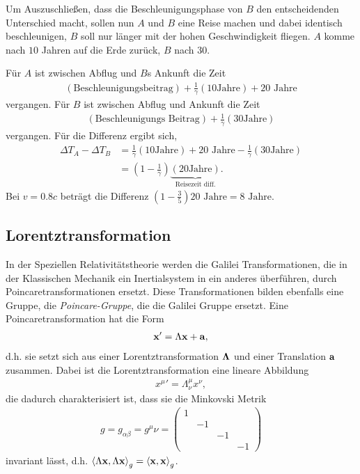 \begin{bsp}
Um Auszuschließen, dass die Beschleunigungsphase von $B$ den entscheidenden
Unterschied macht, sollen nun $A$ und $B$ eine Reise machen und dabei identisch
beschleunigen, $B$ soll nur länger mit der hohen Geschwindigkeit fliegen.
$A$ komme nach $10$ Jahren auf die Erde zurück, $B$ nach $30$.

Für $A$ ist zwischen Abflug und $B$s Ankunft die Zeit
\begin{align*}
(\text{Beschleunigungsbeitrag}) + \frac{1}{\gamma}\left(10 \text{
Jahre}\right) + 20\text{ Jahre}
\end{align*}
vergangen. Für $B$ ist zwischen Abflug und Ankunft die Zeit
\begin{align*}
(\text{Beschleunigungs Beitrag}) + \frac{1}{\gamma}\left(30 \text{
Jahre}\right)
\end{align*}
vergangen. Für die Differenz ergibt sich,
\begin{align*}
\Delta T_A - \Delta T_B &=  \frac{1}{\gamma}\left(10 \text{
Jahre}\right) + 20\text{ Jahre} - \frac{1}{\gamma}\left(30 \text{
Jahre}\right) \\ 
&= \left(1-\frac{1}{\gamma}\right)\underbrace{\left(20\text{
Jahre}\right)}_{\text{Reisezeit diff.}}.
\end{align*}
Bei $v=0.8c$ beträgt die Differenz $\left(1-\frac{3}{5}\right)20\text{ Jahre} =
8\text{ Jahre}$.\bsphere
\end{bsp}

\subsection{Lorentztransformation}

In der Speziellen Relativitätstheorie werden die Galilei Transformationen, die
in der Klassischen Mechanik ein Inertialsystem in ein anderes überführen,
durch Poincaretransformationen ersetzt. Diese Transformationen bilden ebenfalls
eine Gruppe, die \emph{Poincare-Gruppe}, die die Galilei Gruppe ersetzt. Eine
Poincaretransformation hat die Form
\begin{align*}
\bm{\mathrm{x}}' = \Lambda\bm{\mathrm{x}}+\bm{\mathrm{a}},
\end{align*}
d.h. sie setzt sich aus einer Lorentztransformation $\bm{\mathrm{\Lambda}}$ und einer
Translation $\bm{\mathrm{a}}$ zusammen. Dabei ist die Lorentztransformation eine
lineare Abbildung
\begin{align*}
{x^\mu}' = \Lambda_\nu^\mu x^\nu,
\end{align*}
die dadurch charakterisiert ist, dass sie die Minkovski Metrik
\begin{align*}
g=g_{\alpha\beta} = g^\mu\nu = \begin{pmatrix}
                               1 & \\
                               & -1 \\
                               && -1 \\
                               &&& -1
                               \end{pmatrix}
\end{align*}
invariant lässt, d.h. $\left\langle\Lambda \bm{\mathrm{x}},\Lambda \bm{\mathrm{x}}\right\rangle_g =
\left\langle\bm{\mathrm{x}},\bm{\mathrm{x}}\right\rangle_g$.

